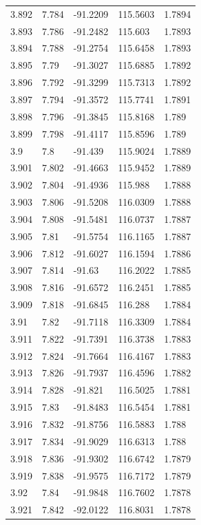 \begin{tabular}{lllll}
3.892 & 7.784 & -91.2209 & 115.5603 & 1.7894 \\
3.893 & 7.786 & -91.2482 & 115.603 & 1.7893 \\
3.894 & 7.788 & -91.2754 & 115.6458 & 1.7893 \\
3.895 & 7.79 & -91.3027 & 115.6885 & 1.7892 \\
3.896 & 7.792 & -91.3299 & 115.7313 & 1.7892 \\
3.897 & 7.794 & -91.3572 & 115.7741 & 1.7891 \\
3.898 & 7.796 & -91.3845 & 115.8168 & 1.789 \\
3.899 & 7.798 & -91.4117 & 115.8596 & 1.789 \\
3.9 & 7.8 & -91.439 & 115.9024 & 1.7889 \\
3.901 & 7.802 & -91.4663 & 115.9452 & 1.7889 \\
3.902 & 7.804 & -91.4936 & 115.988 & 1.7888 \\
3.903 & 7.806 & -91.5208 & 116.0309 & 1.7888 \\
3.904 & 7.808 & -91.5481 & 116.0737 & 1.7887 \\
3.905 & 7.81 & -91.5754 & 116.1165 & 1.7887 \\
3.906 & 7.812 & -91.6027 & 116.1594 & 1.7886 \\
3.907 & 7.814 & -91.63 & 116.2022 & 1.7885 \\
3.908 & 7.816 & -91.6572 & 116.2451 & 1.7885 \\
3.909 & 7.818 & -91.6845 & 116.288 & 1.7884 \\
3.91 & 7.82 & -91.7118 & 116.3309 & 1.7884 \\
3.911 & 7.822 & -91.7391 & 116.3738 & 1.7883 \\
3.912 & 7.824 & -91.7664 & 116.4167 & 1.7883 \\
3.913 & 7.826 & -91.7937 & 116.4596 & 1.7882 \\
3.914 & 7.828 & -91.821 & 116.5025 & 1.7881 \\
3.915 & 7.83 & -91.8483 & 116.5454 & 1.7881 \\
3.916 & 7.832 & -91.8756 & 116.5883 & 1.788 \\
3.917 & 7.834 & -91.9029 & 116.6313 & 1.788 \\
3.918 & 7.836 & -91.9302 & 116.6742 & 1.7879 \\
3.919 & 7.838 & -91.9575 & 116.7172 & 1.7879 \\
3.92 & 7.84 & -91.9848 & 116.7602 & 1.7878 \\
3.921 & 7.842 & -92.0122 & 116.8031 & 1.7878 \\

\end{tabular}

